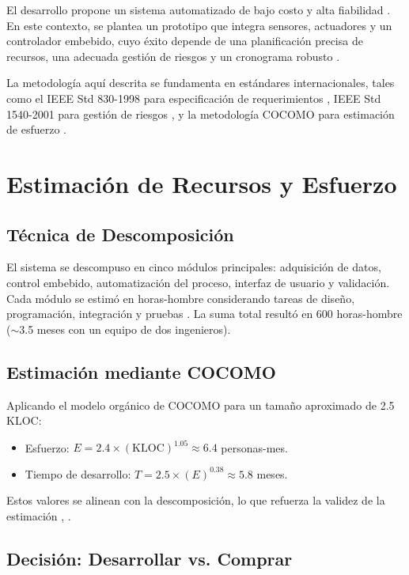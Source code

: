 \documentclass[conference]{IEEEtran}
\begin{document}
	El desarrollo propone un sistema automatizado de bajo costo y alta fiabilidad \cite{b12}. En este contexto, se plantea un prototipo que integra sensores, actuadores y un controlador embebido, cuyo éxito depende de una planificación precisa de recursos, una adecuada gestión de riesgos y un cronograma robusto \cite{b13}.
	
	La metodología aquí descrita se fundamenta en estándares internacionales, tales como el IEEE Std 830-1998 para especificación de requerimientos \cite{b14}, IEEE Std 1540-2001 para gestión de riesgos \cite{b15}, y la metodología COCOMO para estimación de esfuerzo \cite{b16}.
	
	\section{Estimación de Recursos y Esfuerzo}
	
	\subsection{Técnica de Descomposición}
	
	El sistema se descompuso en cinco módulos principales: adquisición de datos, control embebido, automatización del proceso, interfaz de usuario y validación. Cada módulo se estimó en horas-hombre considerando tareas de diseño, programación, integración y pruebas \cite{b17}. La suma total resultó en 600 horas-hombre ($\sim$3.5 meses con un equipo de dos ingenieros).
	
	\subsection{Estimación mediante COCOMO}
	
	Aplicando el modelo orgánico de COCOMO para un tamaño aproximado de 2.5 KLOC:
	
	\begin{itemize}
		\item Esfuerzo: $E = 2.4 \times (\text{KLOC})^{1.05} \approx 6.4$ personas-mes.
		\item Tiempo de desarrollo: $T = 2.5 \times (E)^{0.38} \approx 5.8$ meses.
	\end{itemize}
	
	Estos valores se alinean con la descomposición, lo que refuerza la validez de la estimación \cite{b16}, \cite{b18}.
	
	\subsection{Decisión: Desarrollar vs. Comprar}
	
\end{document}
